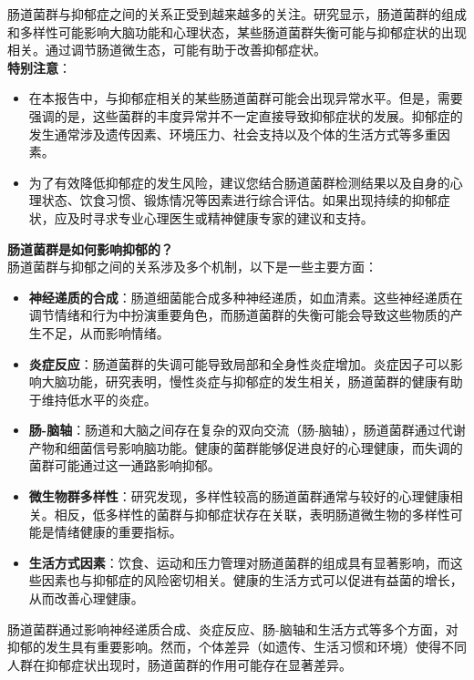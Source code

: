 \documentclass[UTF8]{ctexart}
\begin{document}
\begin{tcolorbox}[
    enhanced,
    colback=customTealBg,
    colframe=customTealBg,
    arc=3mm,
    boxrule=0pt,
    width=\textwidth,
    top=8pt,
    bottom=8pt
]
{\small{\color{customTeal}\faInfoCircle} 肠道菌群与抑郁症之间的关系正受到越来越多的关注。研究显示，肠道菌群的组成和多样性可能影响大脑功能和心理状态，某些肠道菌群失衡可能与抑郁症状的出现相关。通过调节肠道微生态，可能有助于改善抑郁症状。\\

{\color{orange}\faExclamationTriangle} \textbf{特别注意}：
\begin{itemize}
    \item 在本报告中，与抑郁症相关的某些肠道菌群可能会出现异常水平。但是，需要强调的是，这些菌群的丰度异常并不一定直接导致抑郁症状的发展。抑郁症的发生通常涉及遗传因素、环境压力、社会支持以及个体的生活方式等多重因素。
    \item 为了有效降低抑郁症的发生风险，建议您结合肠道菌群检测结果以及自身的心理状态、饮食习惯、锻炼情况等因素进行综合评估。如果出现持续的抑郁症状，应及时寻求专业心理医生或精神健康专家的建议和支持。
\end{itemize}
}
\end{tcolorbox}


\begin{tcolorbox}[
    enhanced,
    colback=lightpurple!10, %
    colframe=lightpurple!10,  %
    arc=3mm,
    boxrule=0.5pt,
    width=\textwidth,
    top=8pt,
    bottom=8pt
]
{\small{\color{lightpurple}\faQuestionCircle}\quad \textbf{肠道菌群是如何影响抑郁的？}\\
{\color{orange!50}\faComments}\quad 肠道菌群与抑郁之间的关系涉及多个机制，以下是一些主要方面：
\begin{itemize}
    \item \textbf{神经递质的合成}：肠道细菌能合成多种神经递质，如血清素。这些神经递质在调节情绪和行为中扮演重要角色，而肠道菌群的失衡可能会导致这些物质的产生不足，从而影响情绪。
    \item \textbf{炎症反应}：肠道菌群的失调可能导致局部和全身性炎症增加。炎症因子可以影响大脑功能，研究表明，慢性炎症与抑郁症的发生相关，肠道菌群的健康有助于维持低水平的炎症。
    \item \textbf{肠-脑轴}：肠道和大脑之间存在复杂的双向交流（肠-脑轴），肠道菌群通过代谢产物和细菌信号影响脑功能。健康的菌群能够促进良好的心理健康，而失调的菌群可能通过这一通路影响抑郁。
    \item \textbf{微生物群多样性}：研究发现，多样性较高的肠道菌群通常与较好的心理健康相关。相反，低多样性的菌群与抑郁症状存在关联，表明肠道微生物的多样性可能是情绪健康的重要指标。
    \item \textbf{生活方式因素}：饮食、运动和压力管理对肠道菌群的组成具有显著影响，而这些因素也与抑郁症的风险密切相关。健康的生活方式可以促进有益菌的增长，从而改善心理健康。
\end{itemize}
肠道菌群通过影响神经递质合成、炎症反应、肠-脑轴和生活方式等多个方面，对抑郁的发生具有重要影响。然而，个体差异（如遗传、生活习惯和环境）使得不同人群在抑郁症状出现时，肠道菌群的作用可能存在显著差异。
}
\end{tcolorbox}
\end{document}
